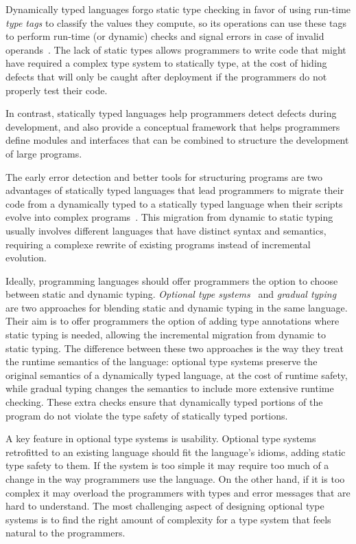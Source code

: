\documentclass[preprint]{sigplanconf}
\begin{document}
Dynamically typed languages forgo static type checking
in favor of using run-time {\em type tags} to classify
the values they compute, so its operations can use these
tags to perform run-time (or dynamic) checks and signal
errors in case of invalid operands~\cite{pierce2002tpl}.
The lack of static types allows programmers to write code
that might have required a complex type system to statically
type, at the cost of hiding defects that will only be caught
after deployment if the programmers do not properly
test their code.

In contrast, statically typed languages help programmers
detect defects during development, and also provide
a conceptual framework that helps programmers define modules
and interfaces that can be combined to structure the development
of large programs.

The early error detection and better tools for structuring
programs are two advantages of statically typed languages that
lead programmers to migrate their code from a dynamically
typed to a statically typed language when their scripts
evolve into complex programs~\cite{tobin-hochstadt2006ims}.
This migration from dynamic to static typing usually involves
different languages that have distinct syntax and semantics,
requiring a complexe rewrite of existing programs instead of
incremental evolution.

Ideally, programming languages should offer programmers the
option to choose between static and dynamic typing.
\emph{Optional type systems}~\cite{bracha2004pluggable} and
\emph{gradual typing}~\cite{siek2006gradual} are two 
approaches for blending static and dynamic typing in the same
language. Their aim is to offer programmers the option
of adding type annotations where static typing is needed,
allowing the incremental migration from dynamic to static
typing. The difference between these two approaches is the
way they treat the runtime semantics of the language:
optional type systems preserve the original semantics
of a dynamically typed language, at the cost of runtime
safety, while gradual typing changes the semantics to
include more extensive runtime checking. These extra checks
ensure that
dynamically typed portions of the program do not violate
the type safety of statically typed portions.

A key feature in optional type systems is usability.
Optional type systems retrofitted to an existing
language should fit the language's idioms, adding
static type safety to them. If the system is too
simple it may require too much of a change in the way
programmers use the language. On the other hand,
if it is too complex it may overload the programmers
with types and error messages that are hard to
understand. The most challenging aspect of designing optional type systems is to find the right amount of complexity for a type system that feels natural to the programmers.
\end{document}

